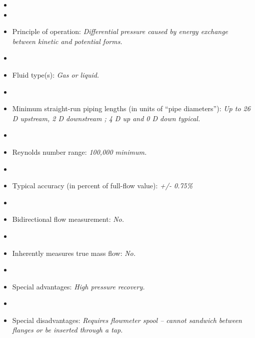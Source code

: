 \documentclass[12pt,a4paper]{article}
\begin{document}
\begin{itemize}
\goodbreak
\item{} 
\vskip 5pt
\item\item{} Principle of operation: {\it Differential pressure caused by energy exchange between kinetic and potential forms.}
\vskip 5pt
\item\item{} Fluid type(s): {\it Gas or liquid.}
\vskip 5pt
\item\item{} Minimum straight-run piping lengths (in units of ``pipe diameters''): {\it Up to 26 D upstream, 2 D downstream ; 4 D up and 0 D down typical.}
\vskip 5pt
\item\item{} Reynolds number range: {\it 100,000 minimum.}
\vskip 5pt
\item\item{} Typical accuracy (in percent of full-flow value): {\it +/- 0.75\%}
\vskip 5pt
\item\item{} Bidirectional flow measurement: {\it No.}
\vskip 5pt
\item\item{} Inherently measures true mass flow: {\it No.}
\vskip 5pt
\item\item{} Special advantages: {\it High pressure recovery.}
\vskip 5pt
\item\item{} Special disadvantages: {\it Requires flowmeter spool -- cannot sandwich between flanges or be inserted through a tap.}
\end{itemize}
\end{document}
